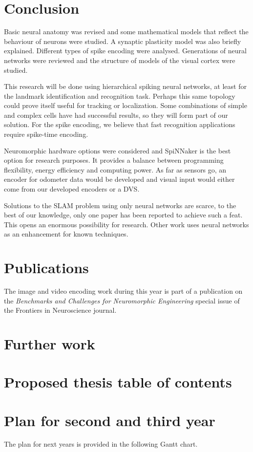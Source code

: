 \section{Conclusion}
Basic neural anatomy was revised and some mathematical models that reflect the behaviour of neurons were studied. A synaptic plasticity model was also briefly explained. Different types of spike encoding were analysed. Generations of neural networks were reviewed and the structure of models of the visual cortex were studied. 

This research will be done using hierarchical spiking neural networks, at least for the landmark identification and recognition task. Perhaps this same topology could prove itself useful for tracking or localization. Some combinations of simple and complex cells have had successful results, so they will form part of our solution. For the spike encoding, we believe that fast recognition applications require spike-time encoding.

Neuromorphic hardware options were considered and SpiNNaker is the best option for research purposes. It provides a balance between programming flexibility, energy efficiency and computing power. As far as sensors go, an encoder for odometer data would be developed and visual input would either come from our developed encoders or a DVS.

Solutions to the SLAM problem using only neural networks are scarce, to the best of our knowledge, only one paper has been reported to achieve such a feat. This opens an enormous possibility for research. Other work uses neural networks as an enhancement for known techniques.

\section{Publications}
The image and video encoding work during this year is part of a publication on the \emph{Benchmarks and Challenges for Neuromorphic Engineering} special issue of the Frontiers in Neuroscience journal.

\section{Further work}


\section{Proposed thesis table of contents}


\section{Plan for second and third year}
%
The plan for next years is provided in the following Gantt chart.
\newpage

